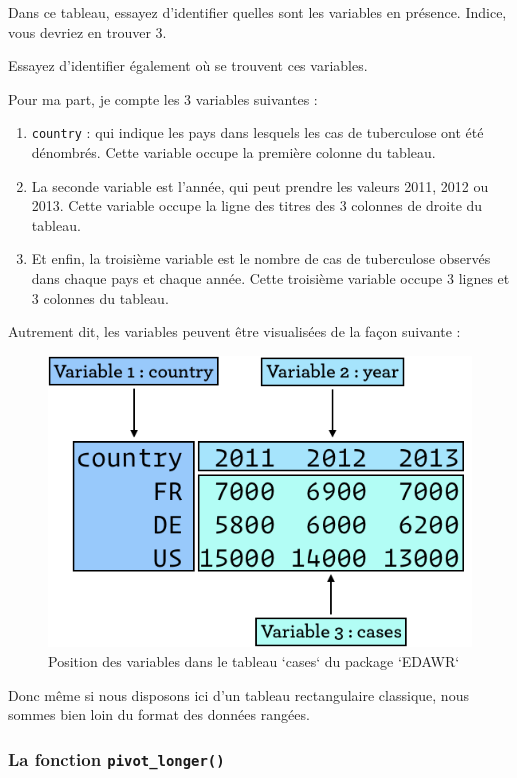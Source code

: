 \documentclass[
  a4paper,
]{article}
\providecommand{\tightlist}{%
  \setlength{\itemsep}{0pt}\setlength{\parskip}{0pt}}
\begin{document}
Dans ce tableau, essayez d'identifier quelles sont les variables en présence. Indice, vous devriez en trouver 3.

Essayez d'identifier également où se trouvent ces variables.

Pour ma part, je compte les 3 variables suivantes :

\begin{enumerate}
\def\labelenumi{\arabic{enumi}.}
\tightlist
\item
  \texttt{country} : qui indique les pays dans lesquels les cas de tuberculose ont été dénombrés. Cette variable occupe la première colonne du tableau.
\item
  La seconde variable est l'année, qui peut prendre les valeurs 2011, 2012 ou 2013. Cette variable occupe la ligne des titres des 3 colonnes de droite du tableau.
\item
  Et enfin, la troisième variable est le nombre de cas de tuberculose observés dans chaque pays et chaque année. Cette troisième variable occupe 3 lignes et 3 colonnes du tableau.
\end{enumerate}

Autrement dit, les variables peuvent être visualisées de la façon suivante :

\begin{figure}[htpb]

{\centering \includegraphics[width=0.5\linewidth]{images/gather} 

}

\caption{Position des variables dans le tableau `cases` du package `EDAWR`}\label{fig:gather}
\end{figure}

Donc même si nous disposons ici d'un tableau rectangulaire classique, nous sommes bien loin du format des données rangées.

\hypertarget{la-fonction-pivot_longer}{%
\subsubsection{\texorpdfstring{La fonction \texttt{pivot\_longer()}}{La fonction pivot\_longer()}}\label{la-fonction-pivot_longer}}
\end{document}
